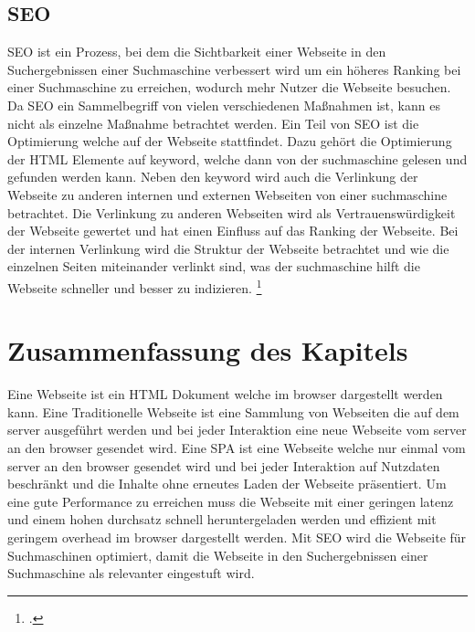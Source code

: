 \subsection{\ac{SEO}}
\ac{SEO} ist ein Prozess, bei dem die Sichtbarkeit einer Webseite in den Suchergebnissen einer Suchmaschine verbessert wird um ein höheres Ranking bei einer Suchmaschine zu erreichen,
wodurch mehr Nutzer die Webseite besuchen.
Da \ac{SEO} ein Sammelbegriff von vielen verschiedenen Maßnahmen ist, kann es nicht als einzelne Maßnahme betrachtet werden.
Ein Teil von \ac{SEO} ist die Optimierung welche auf der Webseite stattfindet.
Dazu gehört die Optimierung der \ac{HTML} Elemente auf \gls{keyword}, welche dann von der \gls{suchmaschine} gelesen und gefunden werden kann.
Neben den \gls{keyword} wird auch die Verlinkung der Webseite zu anderen internen und externen Webseiten von einer \gls{suchmaschine} betrachtet.
Die Verlinkung zu anderen Webseiten wird als Vertrauenswürdigkeit der Webseite gewertet und hat einen Einfluss auf das Ranking der Webseite.
Bei der internen Verlinkung wird die Struktur der Webseite betrachtet und wie die einzelnen Seiten miteinander verlinkt sind, was der \gls{suchmaschine} hilft die Webseite schneller und besser zu indizieren.
\footcite[Vgl.][Seite 5]{John2016}

\section*{Zusammenfassung des Kapitels}
Eine Webseite ist ein \ac{HTML} Dokument welche im \gls{browser} dargestellt werden kann.
Eine Traditionelle Webseite ist eine Sammlung von Webseiten die auf dem \gls{server} ausgeführt werden und bei jeder Interaktion eine neue Webseite vom \gls{server} an den \gls{browser} gesendet wird.
Eine \ac{SPA} ist eine Webseite welche nur einmal vom \gls{server} an den \gls{browser} gesendet wird und bei jeder Interaktion auf Nutzdaten beschränkt und die Inhalte ohne erneutes Laden der Webseite präsentiert.
Um eine gute Performance zu erreichen muss die Webseite mit einer geringen \gls{latenz} und einem hohen \gls{durchsatz} schnell heruntergeladen werden
und effizient mit geringem \gls{overhead} im \gls{browser} dargestellt werden.
Mit \ac{SEO} wird die Webseite für Suchmaschinen optimiert, damit die Webseite in den Suchergebnissen einer Suchmaschine als relevanter eingestuft wird.
